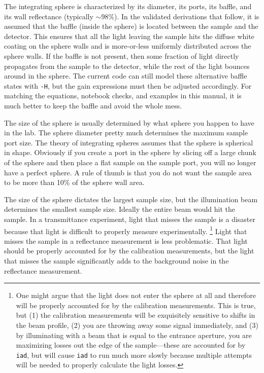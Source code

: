 \documentclass{article}
\newcommand\iadprog{\texttt{iad}}
\begin{document}
The integrating sphere is characterized by its diameter, its ports, its baffle,
and its wall reflectance (typically $\sim$98\%).  In the validated derivations
that follow, it is assumed that the baffle (inside the sphere) is located
between the sample and the detector.  This ensures that all the light leaving 
the sample hits the diffuse white coating on the sphere walls and is more-or-less
uniformly distributed across the sphere walls.  If the baffle is not present, then
some fraction of light directly propagates from the sample to the detector, while
the rest of the light bounces around in the sphere.  The current code can still
model these alternative baffle states with \texttt{-H}, but the gain expressions
must then be adjusted accordingly.  For matching the equations, notebook checks,
and examples in this manual, it is much better to keep the baffle and avoid the
whole mess.  

The size of the sphere is usually determined by what sphere you happen to
have in the lab.  The sphere diameter pretty much determines the maximum
sample port size.  The theory of integrating spheres assumes that the sphere
is spherical in shape.  Obviously if you create a port in the sphere by 
slicing off a large chunk of the sphere and then place a flat sample
on the sample port, you will no longer have a perfect sphere.  A rule of
thumb is that you do not want the sample area to be more than 10\% of the
sphere wall area.  

The size of the sphere dictates the largest sample size, but the illumination
beam determines the smallest sample size.  Ideally the entire beam would hit the
sample.  In a transmittance experiment, light that misses the sample is a
disaster because that light is difficult to properly measure experimentally.%
\footnote{One might argue that the light does not enter the sphere at all and therefore
will be properly accounted for by the calibration measurements.  This is true, but
(1) the calibration measurements will be exquisitely sensitive to shifts in the beam
profile, (2) you are throwing away some signal immediately, and (3) by illuminating
with a beam that is equal to the entrance aperture, you are maximizing losses out
the edge of the sample---these are accounted for by \iadprog{}, but will cause 
\iadprog{} to run much more slowly because multiple attempts will be needed to
properly calculate the light losses.}
Light that misses the sample in a reflectance measurement is less problematic.
That light should be properly accounted for by the calibration measurements, but
the light that misses the sample significantly adds to the background noise
in the reflectance measurement.
\end{document}
